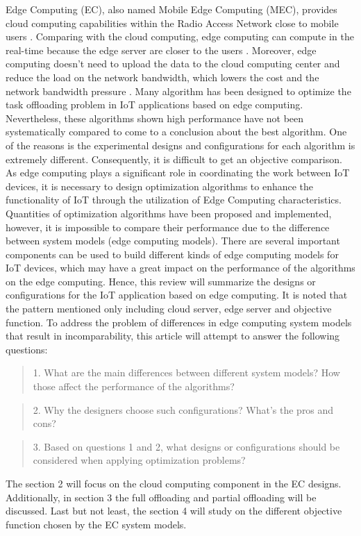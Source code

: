 \documentclass[a4paper,11pt]{article}
\begin{document}
Edge Computing (EC), also named Mobile Edge Computing (MEC), provides cloud computing capabilities within the Radio Access Network close to mobile users \cite{EC_definition}. Comparing with the cloud computing, edge computing can compute in the real-time because the edge server are closer to the users \cite{edge_advantage_archetecture}. Moreover, edge computing doesn't need to upload the data to the cloud computing center and reduce the load on the network bandwidth, which lowers the cost and the network bandwidth pressure \cite{edge_advantage_archetecture}. Many algorithm has been designed to optimize the task offloading problem in IoT applications based on edge computing. Nevertheless, these algorithms shown high performance have not been systematically compared to come to a conclusion about the best algorithm. One of the reasons is the experimental designs and configurations for each algorithm is extremely different. Consequently, it is difficult to get an objective comparison. \newline\newline
As edge computing plays a significant role in coordinating the work between IoT devices, it is necessary to design optimization algorithms to enhance the functionality of IoT through the utilization of Edge Computing characteristics. Quantities of optimization algorithms have been proposed and implemented, however, it is impossible to compare their performance due to the difference between system models (edge computing models). There are several important components can be used to build different kinds of edge computing models for IoT devices, which may have a great impact on the performance of the algorithms on the edge computing. Hence, this review will summarize the designs or configurations for the IoT application based on edge computing. It is noted that the pattern mentioned only including cloud server, edge server and objective function.\newline\newline
To address the problem of differences in edge computing system models that result in incomparability, this article will attempt to answer the following questions:
        \begin{quote}
                1. What are the main differences between different system models? How those affect the performance of the algorithms?
        \end{quote}
        \begin{quote}
                2. Why the designers choose such configurations? What's the pros and cons?
        \end{quote}
        \begin{quote}
                3. Based on questions 1 and 2, what designs or configurations should be considered when applying optimization problems?
        \end{quote}
\noindent The section 2 will focus on the cloud computing component in the EC designs. Additionally, in section 3 the full offloading and partial offloading will be discussed. Last but not least, the section 4 will study on the different objective function chosen by the EC system models.
        
\end{document}
